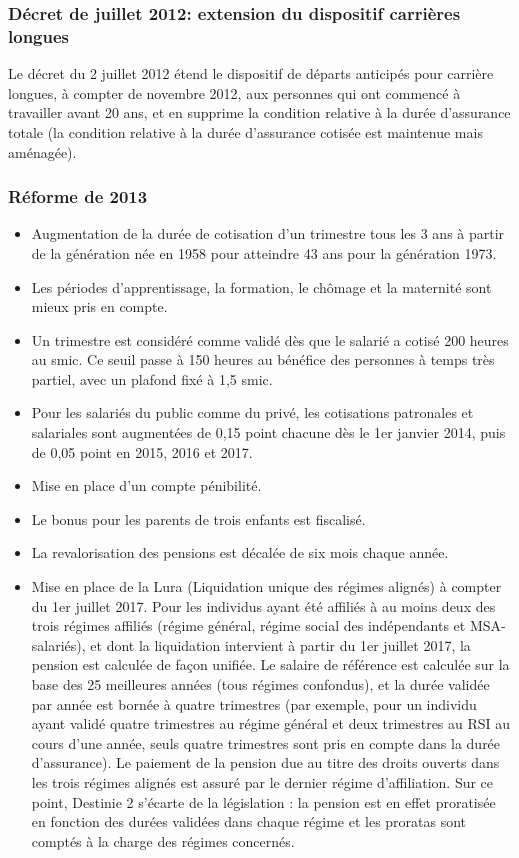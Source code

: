 \subsubsection{Décret de juillet 2012: extension du dispositif carrières longues}

Le décret du 2 juillet 2012 étend le dispositif de départs anticipés pour carrière longues, à compter de novembre 2012, aux personnes qui ont commencé à travailler avant 20 ans, et en supprime la condition relative à la durée d'assurance totale (la condition relative à la durée d'assurance cotisée est maintenue mais aménagée).

\subsubsection{Réforme de 2013}
\begin{itemize}
   \item Augmentation de la durée de cotisation d'un trimestre tous les 3 ans à partir de la génération née en 1958 pour atteindre 43 ans pour la génération 1973.
   \item Les périodes d'apprentissage, la formation, le chômage et la maternité sont mieux pris en compte.
   \item Un trimestre est considéré comme validé dès que le salarié a cotisé 200 heures au smic. Ce seuil passe à 150 heures au bénéfice des personnes à temps très partiel, avec un plafond fixé à 1,5 smic.
   \item Pour les salariés du public comme du privé, les cotisations patronales et salariales sont augmentées de 0,15 point chacune dès le 1er janvier 2014, puis de 0,05 point en 2015, 2016 et 2017.
   \item Mise en place d'un compte pénibilité.
   \item Le bonus pour les parents de trois enfants est fiscalisé.
   \item La revalorisation des pensions est décalée de six mois chaque année.
   \item Mise en place de la Lura (Liquidation unique des régimes alignés) à compter du 1er juillet 2017. Pour les individus ayant été affiliés à au moins deux des trois régimes affiliés (régime général, régime social des indépendants et MSA-salariés), et dont la liquidation intervient à partir du 1er juillet 2017, la pension est calculée de façon unifiée. Le salaire de référence est calculée sur la base des 25 meilleures années (tous régimes confondus), et la durée validée par année est bornée à quatre trimestres (par exemple, pour un individu ayant validé quatre trimestres au régime général et deux trimestres au RSI au cours d'une année, seuls quatre trimestres sont pris en compte dans la durée d'assurance). Le paiement de la pension due au titre des droits ouverts dans les trois régimes alignés est assuré par le dernier régime d’affiliation. Sur ce point, Destinie 2 s'écarte de la législation : la pension est en effet proratisée en fonction des durées validées dans chaque régime et les proratas sont comptés à la charge des régimes concernés.
\end{itemize}

